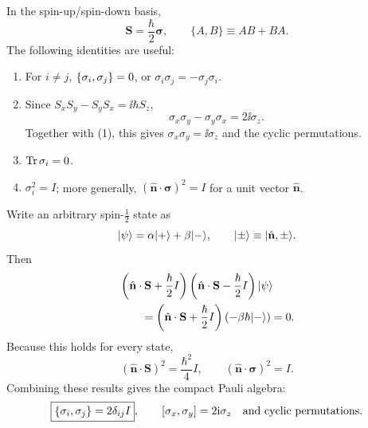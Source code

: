 In the spin-up/spin-down basis,
\[
 \mathbf S=\frac{\hbar}{2}\boldsymbol\sigma,
 \qquad \{A,B\}\equiv AB+BA.
\]
The following identities are useful:
\begin{enumerate}[label=(\arabic*)]
 \item For $i\ne j$, $\left\{\sigma_i,\sigma_j\right\}=0$, or
       $\sigma_i\sigma_j=-\sigma_j\sigma_i$.
 \item Since $S_xS_y-S_yS_x=\ii\hbar S_z$,
 \[
 \sigma_x\sigma_y-\sigma_y\sigma_x=2\ii\sigma_z.
 \]
 Together with (1), this gives $\sigma_x\sigma_y=\ii\sigma_z$ and the
 cyclic permutations.
 \item $\operatorname{Tr}\sigma_i=0$.
 \item $\sigma_i^2=I$; more generally,
       $(\hat{\mathbf n}\cdot\boldsymbol\sigma)^2=I$ for a unit vector
       $\hat{\mathbf n}$.
\end{enumerate}
Write an arbitrary spin-$\tfrac12$ state as
\[
 \lvert \psi\rangle=\alpha\lvert +\rangle+\beta\lvert -\rangle,\qquad
 \lvert \pm\rangle\equiv\lvert \hat{\mathbf n},\pm\rangle.
\]
Then
\begin{align*}
 &\left(\hat{\mathbf n}\cdot\mathbf S+\frac{\hbar}{2}I\right)
  \left(\hat{\mathbf n}\cdot\mathbf S-\frac{\hbar}{2}I\right)\lvert \psi\rangle\\
 &\qquad=\left(\hat{\mathbf n}\cdot\mathbf S+\frac{\hbar}{2}I\right)
      (-\beta\hbar\lvert -\rangle)=0.
\end{align*}
Because this holds for every state,
\[
 (\hat{\mathbf n}\cdot\mathbf S)^2=\frac{\hbar^2}{4}I,
 \qquad(\hat{\mathbf n}\cdot\boldsymbol\sigma)^2=I.
\]
Combining these results gives the compact Pauli algebra:
\[
 \boxed{\left\{\sigma_i,\sigma_j\right\}=2\delta_{ij}I},\qquad
 \left[\sigma_x,\sigma_y\right]=2\mathrm{i}\sigma_z
 \quad\text{and cyclic permutations}.
\]
